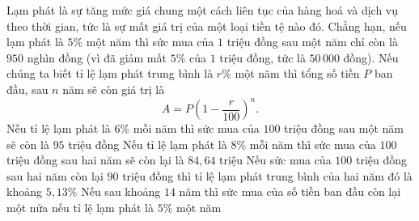 \begin{ex}%
	Lạm phát là sự tăng mức giá chung một cách liên tục của hàng hoá và dịch vụ theo thời gian, tức là sự mất giá trị của một loại tiền tệ nào đó. Chẳng hạn, nếu lạm phát là $5\%$ một năm thì sức mua của $1$ triệu đồng sau một năm chỉ còn là $950$  nghìn đồng (vì đã giảm mất $5\%$ của $1$ triệu đồng, tức là $50\,000$ đồng). Nếu chúng ta biết tỉ lệ lạm phát trung bình là $r\%$ một năm thì tổng số tiền $P$ ban đầu, sau $n$ năm sẽ còn giá trị là
	\[ 
	A  = P\left(1 - \dfrac{r}{100}\right)^n.
	\] 
	 \choiceTF
		{Nếu tỉ lệ lạm phát là $6\%$ mỗi năm thì sức  mua của $100$ triệu đồng sau một năm sẽ còn là $95$ triệu đồng}
		{\True Nếu tỉ lệ lạm phát là $8\%$ mỗi năm thì sức mua của $100$ triệu đồng sau hai năm sẽ còn  lại là $84{,}64$ triệu}
		{\True Nếu sức mua của $100$ triệu đồng sau hai năm còn lại $90$ triệu đồng thì tỉ  lệ lạm phát trung bình của hai năm đó là khoảng $5{,}13\%$}
		{\True Nếu sau khoảng $14$ năm thì sức mua của số tiền  ban đầu còn lại một nửa nếu tỉ lệ lạm phát là $5\%$ một năm}
\end{ex}

